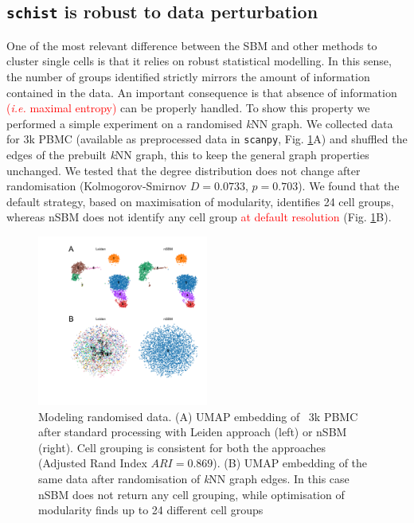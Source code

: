 \documentclass[10pt]{article}
\begin{document}

\subsection*{\texttt{schist} is robust to data perturbation}

One of the most relevant difference between the SBM and other methods to cluster single cells is that it relies on robust statistical modelling. In this sense, the number of groups identified strictly mirrors the amount of information contained in the data. An important consequence is that absence of information \textcolor{red}{(\emph{i.e.} maximal entropy)} can be properly handled. To show this property we performed a simple experiment on a randomised \emph{k}NN graph. We collected data for 3k PBMC (available as preprocessed data in \texttt{scanpy}, Fig. \ref{FigureRandom}A) and shuffled the edges of the prebuilt \emph{k}NN graph, this to keep the general graph properties unchanged. We tested that the degree distribution does not change after randomisation (Kolmogorov-Smirnov $D=0.0733$, $p=0.703$). We found that the default strategy, based on maximisation of modularity, identifies 24 cell groups, whereas nSBM does not identify any cell group \textcolor{red}{at default resolution} (Fig. \ref{FigureRandom}B). 

\begin{figure}[H]
\centering
\includegraphics[keepaspectratio,width=0.5\textwidth,height=\textheight]{FIgure_Random.pdf}
\caption[]{Modeling randomised data. (A) UMAP embedding of ~3k PBMC after standard processing with Leiden approach (left) or nSBM (right). Cell grouping is consistent for both the approaches (Adjusted Rand Index $ARI=0.869$). (B) UMAP embedding of the same data after randomisation of \emph{k}NN graph edges. In this case nSBM does not return any cell grouping, while optimisation of modularity finds up to 24 different cell groups}\label{FigureRandom}
\end{figure}
\end{document}
